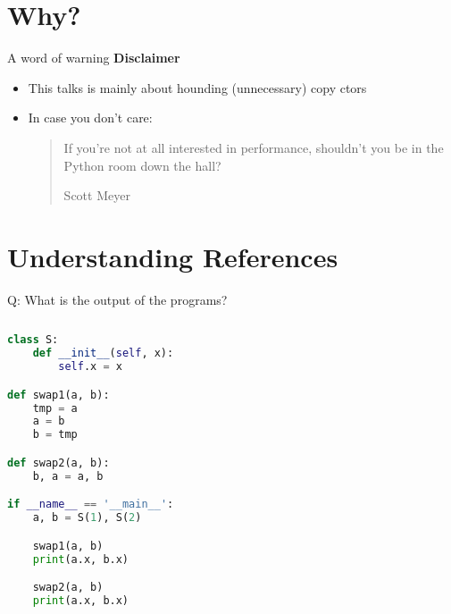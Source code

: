 \section{Why?}

\begin{frame}{A word of warning}
    \textbf{Disclaimer} 
    \begin{itemize}
        \item This talks is mainly about hounding (unnecessary) copy ctors
        \item In case you don't care: \blockquote[Scott Meyer]{If you’re not at all interested in performance, shouldn’t you be in the Python room down the hall?}
    \end{itemize}
\end{frame}

\begin{frame}
    \centering
    \scalebox{3}{Understanding References}
\end{frame}

\section{Understanding References}

\begin{frame}[fragile]{Q: What is the output of the programs?}
    \begin{columns}[t]
        \begin{column}{.45\textwidth}

    \begin{lstlisting}[language=python]
class S:
    def __init__(self, x):
        self.x = x

def swap1(a, b):
    tmp = a
    a = b
    b = tmp

def swap2(a, b):
    b, a = a, b

if __name__ == '__main__':
    a, b = S(1), S(2)

    swap1(a, b)
    print(a.x, b.x)

    swap2(a, b)
    print(a.x, b.x)
    \end{lstlisting}
        \end{column}
        \begin{column}{.45\textwidth}

        \end{column}
    \end{columns}
\end{frame}

